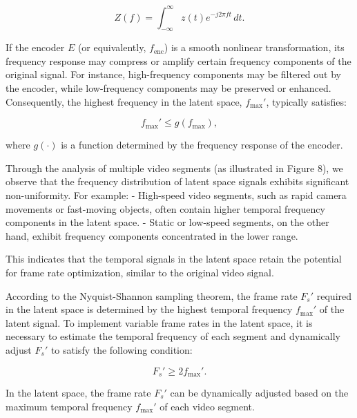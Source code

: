 \[
Z(f) = \int_{-\infty}^{\infty} z(t) e^{-j 2 \pi f t} \, dt.
\]

If the encoder \( E \) (or equivalently, \( f_{\text{enc}} \)) is a smooth nonlinear transformation, its frequency response may compress or amplify certain frequency components of the original signal. For instance, high-frequency components may be filtered out by the encoder, while low-frequency components may be preserved or enhanced. Consequently, the highest frequency in the latent space, \( f_{\text{max}}' \), typically satisfies:

\[
f_{\text{max}}' \leq g(f_{\text{max}}),
\]

where \( g(\cdot) \) is a function determined by the frequency response of the encoder.

Through the analysis of multiple video segments (as illustrated in Figure 8), we observe that the frequency distribution of latent space signals exhibits significant non-uniformity. For example:
- High-speed video segments, such as rapid camera movements or fast-moving objects, often contain higher temporal frequency components in the latent space.
- Static or low-speed segments, on the other hand, exhibit frequency components concentrated in the lower range.

This indicates that the temporal signals in the latent space retain the potential for frame rate optimization, similar to the original video signal.


According to the Nyquist-Shannon sampling theorem, the frame rate \( F_s' \) required in the latent space is determined by the highest temporal frequency \( f_{\text{max}}' \) of the latent signal. To implement variable frame rates in the latent space, it is necessary to estimate the temporal frequency of each segment and dynamically adjust \( F_s' \) to satisfy the following condition:

\[
F_s' \geq 2 f_{\text{max}}'.
\]


In the latent space, the frame rate \( F_s' \) can be dynamically adjusted based on the maximum temporal frequency \( f_{\text{max}}' \) of each video segment. 

